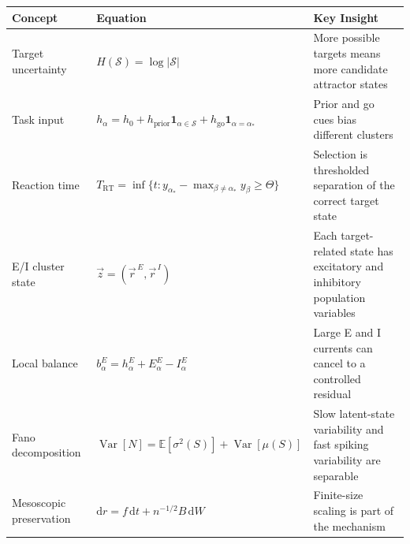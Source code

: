 \begin{chaptersummary}

\begin{center}
\renewcommand{\arraystretch}{1.45}
\begin{tabularx}{\textwidth}{@{}l X X@{}}
  \toprule
  \textbf{Concept} & \textbf{Equation} & \textbf{Key Insight} \\
  \midrule
  Target uncertainty &
  $H(\mathcal{S})=\log|\mathcal{S}|$ &
  More possible targets means more candidate attractor states \\
  Task input &
  $h_{\alpha}=h_0+h_{\mathrm{prior}}\mathbf{1}_{\alpha\in\mathcal{S}}+h_{\mathrm{go}}\mathbf{1}_{\alpha=\alpha_*}$ &
  Prior and go cues bias different clusters \\
  Reaction time &
  $T_{\mathrm{RT}}=\inf\{t:y_{\alpha_*}-\max_{\beta\ne\alpha_*}y_{\beta}\ge\Theta\}$ &
  Selection is thresholded separation of the correct target state \\
  E/I cluster state &
  $\vec z=(\vec r^{\,E},\vec r^{\,I})$ &
  Each target-related state has excitatory and inhibitory population variables \\
  Local balance &
  $b_{\alpha}^{E}=h_{\alpha}^{E}+E_{\alpha}^{E}-I_{\alpha}^{E}$ &
  Large E and I currents can cancel to a controlled residual \\
  Fano decomposition &
  $\operatorname{Var}[N]=\mathbb{E}[\sigma^2(S)]+\operatorname{Var}[\mu(S)]$ &
  Slow latent-state variability and fast spiking variability are separable \\
  Mesoscopic preservation &
  $\mathrm{d}r=f\,\mathrm{d}t+n^{-1/2}B\,\mathrm{d}W$ &
  Finite-size scaling is part of the mechanism \\
  \bottomrule
\end{tabularx}
\end{center}

\end{chaptersummary}

